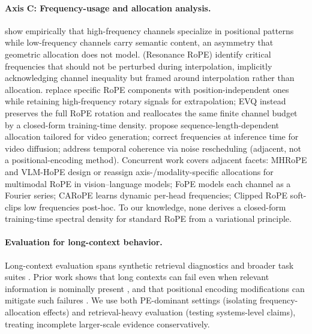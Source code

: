 \paragraph{Axis C: Frequency-usage and allocation analysis.}
\citet{barbero2025round} show empirically that high-frequency channels specialize in positional patterns while low-frequency channels carry semantic content, an asymmetry that geometric allocation does not model. \citet{wang2024resonance} (Resonance RoPE) identify critical frequencies that should not be perturbed during interpolation, implicitly acknowledging channel inequality but framed around interpolation rather than allocation. \citet{chen2025hope} replace specific RoPE components with position-independent ones while retaining high-frequency rotary signals for extrapolation; EVQ instead preserves the full RoPE rotation and reallocates the same finite channel budget by a closed-form training-time density. \citet{videorope2025} propose sequence-length-dependent allocation tailored for video generation; \citet{zhao2025riflex} correct frequencies at inference time for video diffusion; \citet{qiu2024freenoise} address temporal coherence via noise rescheduling (adjacent, not a positional-encoding method). Concurrent work covers adjacent facets: MHRoPE \citep{qwen2026mhrope} and VLM-HoPE \citep{li2025hope} design or reassign axis-/modality-specific allocations for multimodal RoPE in vision--language models; FoPE \citep{hua2025fope} models each channel as a Fourier series; CARoPE \citep{veisi2025carope} learns dynamic per-head frequencies; Clipped RoPE \citep{li2026copeclipped} soft-clips low frequencies post-hoc. To our knowledge, none derives a closed-form training-time spectral density for standard RoPE from a variational principle.

\paragraph{Evaluation for long-context behavior.}
Long-context evaluation spans synthetic retrieval diagnostics and broader task suites \citep{bai2024longbench, hsieh2024ruler}. Prior work shows that long contexts can fail even when relevant information is nominally present \citep{liu2024lost}, and that positional encoding modifications can mitigate such failures \citep{zhang2024found}. We use both PE-dominant settings (isolating frequency-allocation effects) and retrieval-heavy evaluation (testing systems-level claims), treating incomplete larger-scale evidence conservatively.

